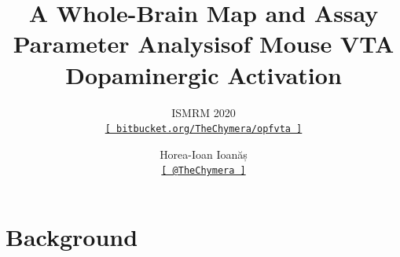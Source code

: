 

\title[Whole-Brain Map and Assay Parameter Analysisof Mouse VTA Dopaminergic Activation --- ISMRM 2020]{A Whole-Brain Map and Assay Parameter Analysisof Mouse VTA Dopaminergic Activation}
\subtitle{ISMRM 2020\\\href{https://bitbucket.org/TheChymera/opfvta}{\small\texttt{[ bitbucket.org/TheChymera/opfvta ]}}}
\author[Horea-Ioan Ioanăș]{Horea-Ioan Ioanăș\\\href{https://twitter.com/TheChymera}{\small\texttt{[ @TheChymera ]}}}
\date{}

	\begin{frame}
		\titlepage
	\end{frame}
	\section{Background}
